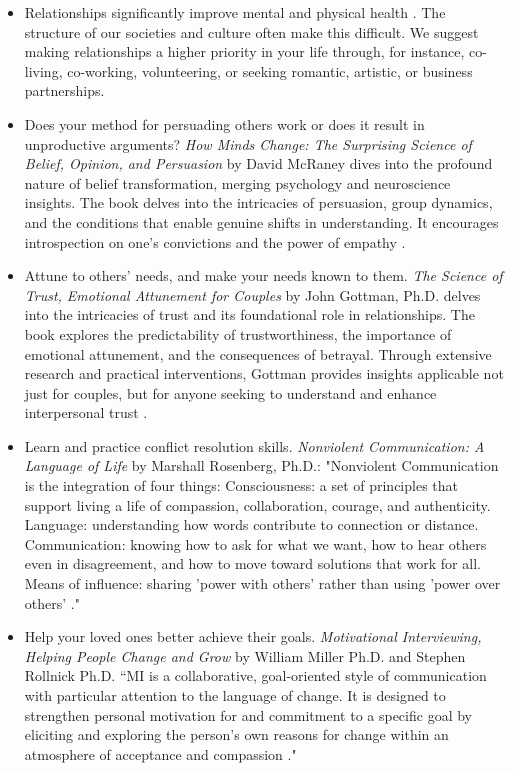 \documentclass[12pt,letterpaper]{article}
\begin{document}
\begin{itemize}
    \item Relationships significantly improve mental and physical health \cite{holt-lunstadRelationships}. The structure of our societies and culture often make this difficult. We suggest making relationships a higher priority in your life through, for instance, co-living, co-working, volunteering, or seeking romantic, artistic, or business partnerships.  
    \item Does your method for persuading others work or does it result in unproductive arguments? \textit{How Minds Change: The Surprising Science of Belief, Opinion, and Persuasion} by David McRaney dives into the profound nature of belief transformation, merging psychology and neuroscience insights. The book delves into the intricacies of persuasion, group dynamics, and the conditions that enable genuine shifts in understanding. It encourages introspection on one's convictions and the power of empathy \cite{mcraneyMinds}.
    \item Attune to others' needs, and make your needs known to them. \textit{The Science of Trust, Emotional Attunement for Couples} by John Gottman, Ph.D. delves into the intricacies of trust and its foundational role in relationships. The book explores the predictability of trustworthiness, the importance of emotional attunement, and the consequences of betrayal. Through extensive research and practical interventions, Gottman provides insights applicable not just for couples, but for anyone seeking to understand and enhance interpersonal trust \cite{gottmanTrust}.
    \item Learn and practice conflict resolution skills. \textit{Nonviolent Communication: A Language of Life} by Marshall Rosenberg, Ph.D.: "Nonviolent Communication is the integration of four things: Consciousness: a set of principles that support living a life of compassion, collaboration, courage, and authenticity. Language: understanding how words contribute to connection or distance. Communication: knowing how to ask for what we want, how to hear others even in disagreement, and how to move toward solutions that work for all. Means of influence: sharing 'power with others' rather than using 'power over others' \cite{rosenbergNVC}."
    \item Help your loved ones better achieve their goals. \textit{Motivational Interviewing, Helping People Change and Grow} by William Miller Ph.D. and Stephen Rollnick Ph.D. “MI is a collaborative, goal-oriented style of communication with particular attention to the language of change. It is designed to strengthen personal motivation for and commitment to a specific goal by eliciting and exploring the person's own reasons for change within an atmosphere of acceptance and compassion \cite{millerMotivationalInterviewing}."

\end{itemize}
\end{document}
